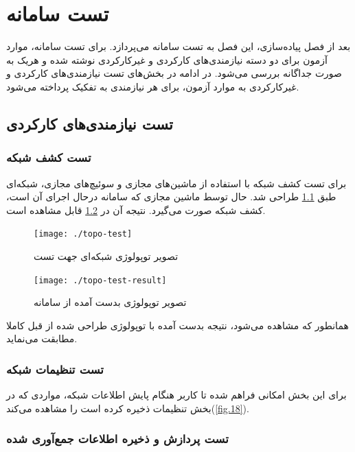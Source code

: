 \chapter{تست سامانه}

بعد از فصل پیاده‌سازی، این فصل به تست سامانه می‌پردازد. برای تست سامانه، موارد آزمون برای دو دسته نیازمندی‌های کارکردی و غیرکارکردی نوشته شده و هریک به صورت جداگانه بررسی می‌شود. در ادامه در بخش‌های تست نیازمندی‌های کارکردی و غیرکارکردی به موارد آزمون، برای هر نیازمندی به تفکیک پرداخته می‌شود.

\section{تست نیازمندی‌های کارکردی}

\subsection{تست کشف شبکه}
برای تست کشف شبکه با استفاده از ماشین‌های مجازی و سوئیچ‌های مجازی، شبکه‌ای طبق \cref{fig.51} طراحی شد. حال توسط ماشین مجازی که سامانه درحال اجرای آن است، کشف شبکه صورت می‌گیرد. نتیجه آن در \cref{fig.52} قابل مشاهده است.


\begin{figure}[!h]
    \centering\texttt{[image: ./topo-test]}
    \caption{تصویر توپولوژی شبکه‌ای جهت تست}\label{fig.51}
\end{figure}


\begin{figure}[!h]
    \centering\texttt{[image: ./topo-test-result]}
    \caption{تصویر توپولوژی بدست آمده از سامانه}\label{fig.52}
\end{figure}




\cleardoublepage

همانطور که مشاهده می‌شود، نتیجه بدست آمده با توپولوژی طراحی شده از قبل کاملا مطابقت می‌نماید.

\subsection{تست تنظیمات شبکه}

برای این بخش امکانی فراهم شده تا کاربر هنگام پایش اطلاعات شبکه، مواردی که در بخش تنظیمات ذخیره کرده است را مشاهده می‌کند(\cref{fig.18}).


\subsection{تست پردازش و ذخیره اطلاعات جمع‌آوری شده}

